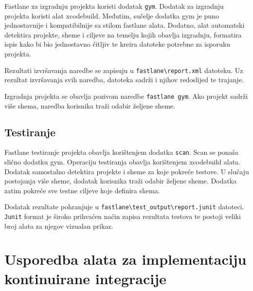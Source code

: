\documentclass[times, utf8, diplomski, numeric]{fer}
\begin{document}
\begin{appendices}
Fastlane za izgradnju projekta koristi dodatak \verb|gym|\citep{fastlane:gym}. Dodatak za izgradnju projekta koristi alat xcodebuild. Međutim, sučelje dodatka gym je puno jednostavnije i kompatibilnije sa stilom fastlane alata. Dodatno, alat automatski detektira projekte, sheme i ciljeve na temelju kojih obavlja izgradnju, formatira ispis kako bi bio jednostavno čitljiv te kreira datoteke potrebne za isporuku projekta.

Rezultati izvršavanja naredbe se zapisuju u \verb|fastlane\report.xml| datoteku. Uz rezultat izvršavanja svih naredba, datoteka sadrži i njihov redoslijed te trajanje.

Izgradnja projekta se obavlja pozivom naredbe \verb|fastlane gym|. Ako projekt sadrži više shema, naredba korisnika traži odabir željene sheme.

\section{Testiranje}

Fastlane testiranje projekta obavlja korištenjem dodatka \verb|scan|\citep{fastlane:scan}. Scan se ponaša slično dodatku gym. Operaciju testiranja obavlja korištenjem xcodebuild alata. Dodatak samostalno detektira projekte i sheme za koje pokreće testove. U slučaju postojanja više sheme, dodatak korisnika traži odabir željene sheme. Dodatka zatim pokreče sve testne ciljeve koje definira shema.

Dodatak rezultate pohranjuje u \verb|fastlane\test_output\report.junit| datoteci. \verb|Junit| format je široko prihvaćen naćin zapisa rezultata testova te postoji veliki broj alata za njegov vizualan prikaz.

\chapter{Usporedba alata za implementaciju kontinuirane integracije} \label{header:dodatak_usporedba_alata_za_kontinuiranu_integraciju}

\end{appendices}
\end{document}
